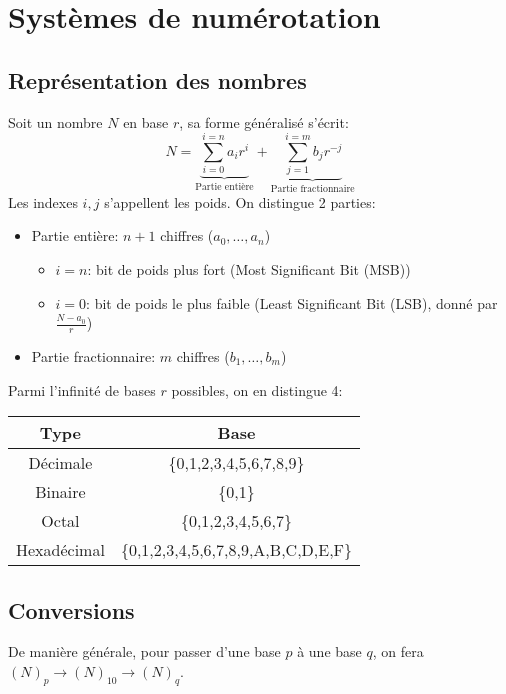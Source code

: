\chapter{Systèmes de numérotation}
\section{Représentation des nombres}
Soit un nombre $N$ en base $r$, sa forme généralisé s'écrit:
\begin{equation}
	N = \underbrace{\sum_{i=0}^{i=n}a_ir^i}_{\text{Partie entière}} + \underbrace{\sum_{j=1}^{i=m}b_jr^{-j}}_{\text{Partie fractionnaire}}
\end{equation}
Les indexes $i,j$ s'appellent les poids. On distingue 2 parties:
\begin{itemize}
	\item Partie entière:  $n+1$ chiffres ($a_0,\dots,a_n$)
  \begin{itemize}
		\item $i=n$: bit de poids plus fort (Most Significant Bit (MSB))
	  \item $i=0$: bit de poids le plus faible (Least Significant Bit (LSB), donné par $\frac{N-a_0}{r}$)
	  \end{itemize}
	\item Partie fractionnaire: $m$ chiffres ($b_1,\dots,b_m$)
\end{itemize}
Parmi l'infinité de bases $r$ possibles, on en distingue 4:
\begin{center}
	\begin{tabular}{|c|c|}
		\hline
		Type         & Base                                \\
		\hline
		Décimale    & \{0,1,2,3,4,5,6,7,8,9\}             \\
		Binaire      & \{0,1\}                             \\
		Octal        & \{0,1,2,3,4,5,6,7\}                 \\
		Hexadécimal & \{0,1,2,3,4,5,6,7,8,9,A,B,C,D,E,F\} \\
		\hline
	\end{tabular}
	\label{bases utiles}
\end{center}
\section{Conversions}
De manière générale, pour passer d'une base $p$ à une base $q$, on fera $(N)_p\rightarrow (N)_{10}\rightarrow (N)_q$. \\

